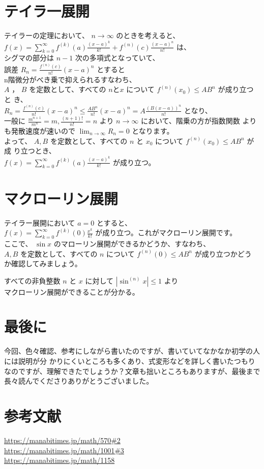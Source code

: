 \documentclass[10pt]{article}
\begin{document}
\section*{テイラ一展開}
テイラーの定理において、 $n \rightarrow \infty$ のときを考えると、\\
$f(x)=\sum_{k=0}^{\infty} f^{(k)}(a) \frac{(x-a)^{k}}{k!}+f^{(n)}(c) \frac{(x-a)^{n}}{n!}$ は、\\
シグマの部分は $n-1$ 次の多項式となっていて、\\
誤差 $R_{n}=\frac{f^{(n)}(c)}{n!}(x-a)^{n}$ とすると\\
n階微分がべき乗で抑えられるすなわち、\\
$A$ ， $B$ を定数として、すべての $n と x$ について $f^{(n)}\left(x_{0}\right) \leq A B^{n}$ が成り立つと き、\\
$R_{n}=\frac{f^{(n)}(c)}{n!}(x-a)^{n} \leq \frac{A B^{n}}{n!}(x-a)^{n}=A \frac{(B(x-a))^{n}}{n!}$ となり、\\
一般に $\frac{m^{n+1}}{m^{n}}=m, \frac{(n+1)!}{n!}=n$ より $n \rightarrow \infty$ において、階乗の方が指数関数 よりも発散速度が速いので $\lim _{n \rightarrow \infty} R_{n}=0$ となります。\\
よって、 $A, B$ を定数として、すべての $n$ と $x_{0}$ について $f^{(n)}\left(x_{0}\right) \leq A B^{n}$ が成 り立つとき、\\
$f(x)=\sum_{k=0}^{\infty} f^{(k)}(a) \frac{(x-a)^{k}}{k!}$ が成り立つ。

\section*{マクローリン展開}
テイラー展開において $a=0$ とすると、\\
$f(x)=\sum_{k=0}^{\infty} f^{(k)}(0) \frac{x^{k}}{k!}$ が成り立つ。これがマクローリン展開です。\\
ここで、 $\sin x$ のマローリン展開ができるかどうか、すなわち、\\
$A, B$ を定数として、すべての $n$ について $f^{(n)}(0) \leq A B^{n}$ が成り立つかどう か確認してみましょう。

すべての非負整数 $n$ と $x$ に対して $\left|\sin ^{(n)} x\right| \leq 1$ より\\
マクローリン展開ができることが分かる。

\section*{最後に}
今回、色々確認、参考にしながら書いたのですが、書いていてなかなか初学の人には説明が分 かりにくいところも多くあり、式変形などを詳しく書いたつもりなのですが、理解できたでしょうか？文章も拙いところもありますが、最後まで長々読んでくださりありがとうございました。

\section*{参考文献}
\href{https://manabitimes.jp/math/570#2}{https://manabitimes.jp/math/570\#2}\\
\href{https://manabitimes.jp/math/1001#3}{https://manabitimes.jp/math/1001\#3}\\
\href{https://manabitimes.jp/math/1158}{https://manabitimes.jp/math/1158}
\end{document}
